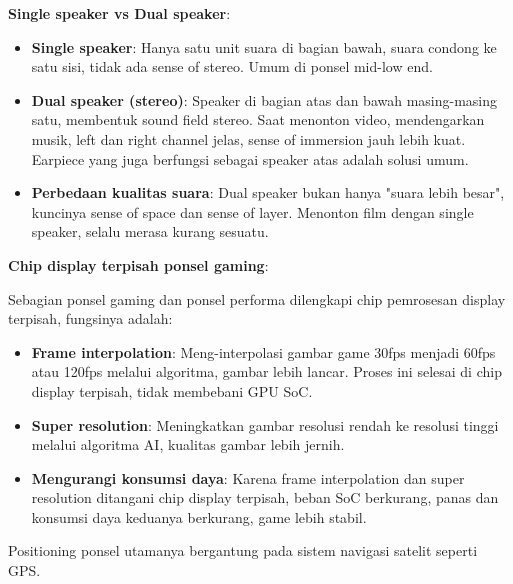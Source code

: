 
\textbf{Single speaker vs Dual speaker}:

\begin{itemize}
  \item \textbf{Single speaker}: Hanya satu unit suara di bagian bawah, suara condong ke satu sisi, tidak ada sense of stereo. Umum di ponsel mid-low end.
  \item \textbf{Dual speaker (stereo)}: Speaker di bagian atas dan bawah masing-masing satu, membentuk sound field stereo. Saat menonton video, mendengarkan musik, left dan right channel jelas, sense of immersion jauh lebih kuat. Earpiece yang juga berfungsi sebagai speaker atas adalah solusi umum.
  \item \textbf{Perbedaan kualitas suara}: Dual speaker bukan hanya "suara lebih besar", kuncinya sense of space dan sense of layer. Menonton film dengan single speaker, selalu merasa kurang sesuatu.
\end{itemize}

\textbf{Chip display terpisah ponsel gaming}:

Sebagian ponsel gaming dan ponsel performa dilengkapi chip pemrosesan display terpisah, fungsinya adalah:

\begin{itemize}
  \item \textbf{Frame interpolation}: Meng-interpolasi gambar game 30fps menjadi 60fps atau 120fps melalui algoritma, gambar lebih lancar. Proses ini selesai di chip display terpisah, tidak membebani GPU SoC.
  \item \textbf{Super resolution}: Meningkatkan gambar resolusi rendah ke resolusi tinggi melalui algoritma AI, kualitas gambar lebih jernih.
  \item \textbf{Mengurangi konsumsi daya}: Karena frame interpolation dan super resolution ditangani chip display terpisah, beban SoC berkurang, panas dan konsumsi daya keduanya berkurang, game lebih stabil.
\end{itemize}


Positioning ponsel utamanya bergantung pada sistem navigasi satelit seperti GPS.

